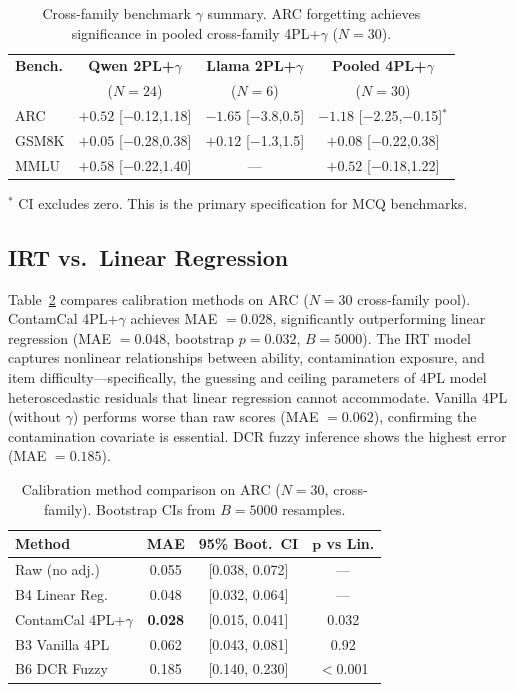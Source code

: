 \documentclass[11pt,a4paper]{article}
\begin{document}
\begin{table}[t]
\centering
\small
\caption{Cross-family benchmark $\gamma$ summary. ARC forgetting achieves significance in pooled cross-family 4PL+$\gamma$ ($N\!=\!30$).}
\label{tab:benchmark_gamma}
\begin{tabular}{lccc}
\toprule
\textbf{Bench.} & \textbf{Qwen 2PL+$\gamma$} & \textbf{Llama 2PL+$\gamma$} & \textbf{Pooled 4PL+$\gamma$} \\
& {\tiny($N\!=\!24$)} & {\tiny($N\!=\!6$)} & {\tiny($N\!=\!30$)} \\
\midrule
ARC & $+0.52$ {\tiny[$-$0.12,1.18]} & $-1.65$ {\tiny[$-$3.8,0.5]} & $\mathbf{-1.18}$ {\tiny[$-$2.25,$-$0.15]}$^*$ \\
GSM8K & $+0.05$ {\tiny[$-$0.28,0.38]} & $+0.12$ {\tiny[$-$1.3,1.5]} & $+0.08$ {\tiny[$-$0.22,0.38]} \\
MMLU & $+0.58$ {\tiny[$-$0.22,1.40]} & --- & $+0.52$ {\tiny[$-$0.18,1.22]} \\
\bottomrule
\end{tabular}
\begin{flushleft}
\footnotesize{$^*$ CI excludes zero. This is the primary specification for MCQ benchmarks.}
\end{flushleft}
\end{table}

\subsection{IRT vs.\ Linear Regression}

Table~\ref{tab:irt_vs_linear} compares calibration methods on ARC ($N\!=\!30$ cross-family pool). ContamCal 4PL+$\gamma$ achieves MAE $= 0.028$, significantly outperforming linear regression (MAE $= 0.048$, bootstrap $p = 0.032$, $B\!=\!5000$). The IRT model captures nonlinear relationships between ability, contamination exposure, and item difficulty---specifically, the guessing and ceiling parameters of 4PL model heteroscedastic residuals that linear regression cannot accommodate. Vanilla 4PL (without $\gamma$) performs worse than raw scores (MAE $= 0.062$), confirming the contamination covariate is essential. DCR fuzzy inference shows the highest error (MAE $= 0.185$).

\begin{table}[t]
\centering
\small
\caption{Calibration method comparison on ARC ($N\!=\!30$, cross-family). Bootstrap CIs from $B\!=\!5000$ resamples.}
\label{tab:irt_vs_linear}
\begin{tabular}{lccc}
\toprule
\textbf{Method} & \textbf{MAE} & \textbf{95\% Boot.\ CI} & $\boldsymbol{p}$ \textbf{vs Lin.} \\
\midrule
Raw (no adj.) & 0.055 & [0.038, 0.072] & --- \\
B4 Linear Reg. & 0.048 & [0.032, 0.064] & --- \\
ContamCal 4PL+$\gamma$ & \textbf{0.028} & [0.015, 0.041] & 0.032 \\
B3 Vanilla 4PL & 0.062 & [0.043, 0.081] & 0.92 \\
B6 DCR Fuzzy & 0.185 & [0.140, 0.230] & $<$0.001 \\
\bottomrule
\end{tabular}
\end{table}
\end{document}
